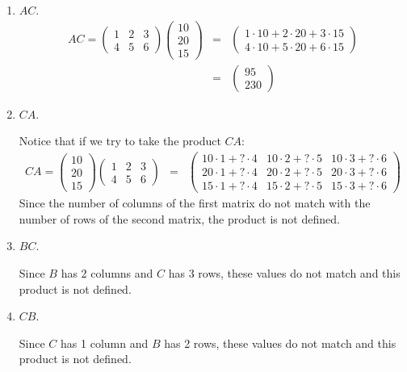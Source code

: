 \begin{example}
\begin{enumerate}
    \item $AC$.
    \begin{eqnarray*}
    AC=\begin{pmatrix}
1 & 2 & 3\\ 4 & 5 & 6
\end{pmatrix}\begin{pmatrix}
10\\20\\15
\end{pmatrix}&=&\begin{pmatrix}
1\cdot10+2\cdot20+3\cdot15 \\ 4\cdot10+5\cdot20+6\cdot15
\end{pmatrix}\\
&=&\begin{pmatrix}
95 \\ 230
\end{pmatrix}
    \end{eqnarray*}
    
    
    
    \item $CA$.
    
    Notice that if we try to take the product $CA$:
    \begin{eqnarray*}
    CA=\begin{pmatrix}
10\\20\\15
\end{pmatrix}\begin{pmatrix}
1 & 2 & 3\\ 4 & 5 & 6
\end{pmatrix}&=&\begin{pmatrix}
10\cdot1+?\cdot4 & 10\cdot2+?\cdot5 & 10\cdot3+?\cdot6 \\ 20\cdot1+?\cdot4 & 20\cdot2+?\cdot5 & 20\cdot3+?\cdot6\\15\cdot1+?\cdot4 & 15\cdot2+?\cdot5 & 15\cdot3+?\cdot6
\end{pmatrix}
    \end{eqnarray*}
Since the number of columns of the first matrix do not match with the number of rows of the second matrix, the product is not defined.    
    
    \item $BC$.
    
    Since $B$ has 2 columns and $C$ has 3 rows, these values do not match and this product is not defined.
    \item $CB$.
    
    Since $C$ has 1 column and $B$ has 2 rows, these values do not match and this product is not defined.
\end{enumerate}


\end{example}

